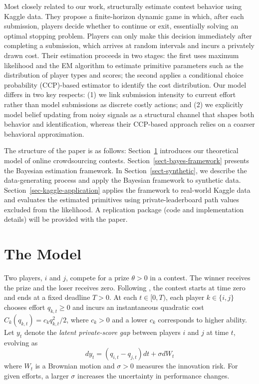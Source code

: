 \documentclass[mnsc]{informs3}
\begin{document}
Most closely related to our work, \citet{lemus2021dynamic} structurally estimate contest behavior using Kaggle data.
They propose a finite-horizon dynamic game in which, after each submission, players decide whether to continue or exit, essentially solving an optimal stopping problem.
Players can only make this decision immediately after completing a submission, which arrives at random intervals and incurs a privately drawn cost.
Their estimation proceeds in two stages: the first uses maximum likelihood and the EM algorithm to estimate primitive parameters such as the distribution of player types and scores; the second applies a conditional choice probability (CCP)-based estimator to identify the cost distribution.
Our model differs in two key respects:
(1) we link submission intensity to current effort rather than model submissions as discrete costly actions; and
(2) we explicitly model belief updating from noisy signals as a structural channel that shapes both behavior and identification, whereas their CCP-based approach relies on a coarser behavioral approximation.







The structure of the paper is as follows:
Section~\ref{contest-theory} introduces our theoretical model of online crowdsourcing contests.
Section~\ref{sect-bayes-framework} presents the Bayesian estimation framework.
In Section~\ref{sect-synthetic}, we describe the data-generating process and apply the Bayesian framework to synthetic data.
Section~\ref{sec-kaggle-application} applies the framework to real-world Kaggle data and evaluates the estimated primitives using private-leaderboard path values excluded from the likelihood.
A replication package (code and implementation details) will be provided with the paper.



\section{The Model}\label{contest-theory}

Two players, $i$ and $j$, compete for a prize {$\theta>0$} in a contest.
The winner receives the prize and the loser receives zero.
{Following \cite{Ryvkin2022Fight}, the contest starts at time zero and ends at a fixed deadline $T>0$.}
{At each $t\in[0,T)$, each player $k\in\{i,j\}$ chooses effort $q_{k,t}\geq0$ and incurs an instantaneous quadratic cost $C_k(q_{k,t})=c_kq_{k,t}^2/2$, where $c_k>0$ and a lower $c_k$ corresponds to higher ability.}
Let $y_t$ denote the {\color{black}\textit{latent private-score gap}} between players $i$ and $j$ at time $t$, evolving as
\begin{equation}\label{eq-state-dynamics}
	dy_t = (q_{i,t}-q_{j,t})dt + \sigma dW_t
\end{equation}
where $W_t$ is a Brownian motion and $\sigma>0$ measures the innovation risk.
{For given efforts, a larger $\sigma$ increases the uncertainty in performance changes.}
\end{document}
